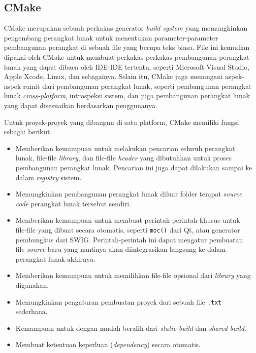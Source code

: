 \subsection{CMake \cite{kitware:2022:masteringcmake}}
\label{sec:cmodules-CMake}

CMake merupakan sebuah perkakas generator \textit{build system} yang memungkinkan pengembang perangkat lunak untuk menentukan parameter-parameter pembangunan perangkat di sebuah file yang berupa teks biasa. File ini kemudian dipakai oleh CMake untuk membuat perkakas-perkakas pembangunan perangkat lunak yang dapat dibaca oleh IDE-IDE tertentu, seperti Microsoft Visual Studio, Apple Xcode, Linux, dan sebagainya. Selain itu, CMake juga menangani aspek-aspek rumit dari pembangunan perangkat lunak, seperti pembangunan perangkat lunak \textit{cross-platform}, introspeksi sistem, dan juga pembangunan perangkat lunak yang dapat disesuaikan berdasarkan penggunanya.

Untuk proyek-proyek yang dibangun di satu platform, CMake memiliki fungsi sebagai berikut.

\begin{itemize}
	\item Memberikan kemampuan untuk melakukan pencarian seluruh perangkat lunak, file-file \textit{library}, dan file-file \textit{header} yang dibutuhkan untuk proses pembangunan perangkat lunak. Pencarian ini juga dapat dilakukan sampai ke dalam \textit{registry} sistem.
	\item Memungkinkan pembangunan perangkat lunak diluar folder tempat \textit{source code} perangkat lunak tersebut sendiri.
	\item Memberikan kemampuan untuk membuat perintah-perintah khusus untuk file-file yang dibuat secara otomatis, seperti \verb|moc()| dari Qt, atau generator pembungkus dari SWIG. Perintah-perintah ini dapat mengatur pembuatan file \textit{source} baru yang nantinya akan diintegrasikan langsung ke dalam perangkat lunak akhirnya.
	\item Memberikan kemampuan untuk memilihkan file-file opsional dari \textit{library} yang digunakan.
	\item Memungkinkan pengaturan pembuatan proyek dari sebuah file \verb|.txt| sederhana.
	\item Kemampuan untuk dengan mudah beralih dari \textit{static build} dan \textit{shared build}.
	\item Membuat ketentuan keperluan (\textit{dependency}) secara otomatis.
\end{itemize}


